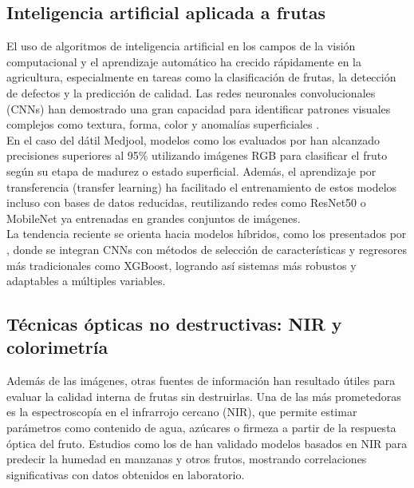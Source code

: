 \subsection{Inteligencia artificial aplicada a frutas}

El uso de algoritmos de inteligencia artificial en los campos de la visión computacional y el aprendizaje automático ha crecido rápidamente en la agricultura, especialmente en tareas como la clasificación de frutas, la detección de defectos y la predicción de calidad. Las redes neuronales convolucionales (CNNs) han demostrado una gran capacidad para identificar patrones visuales complejos como textura, forma, color y anomalías superficiales \parencite{albarrak_deep_2022, alsirhani_novel_2023}.\\

En el caso del dátil Medjool, modelos como los evaluados por \parencite{almomen_date_2023} han alcanzado precisiones superiores al 95\% utilizando imágenes RGB para clasificar el fruto según su etapa de madurez o estado superficial. Además, el aprendizaje por transferencia (transfer learning) ha facilitado el entrenamiento de estos modelos incluso con bases de datos reducidas, reutilizando redes como ResNet50 o MobileNet ya entrenadas en grandes conjuntos de imágenes.\\

La tendencia reciente se orienta hacia modelos híbridos, como los presentados por \parencite{said_smartripen_2025}, donde se integran CNNs con métodos de selección de características y regresores más tradicionales como XGBoost, logrando así sistemas más robustos y adaptables a múltiples variables.\\

\subsection{Técnicas ópticas no destructivas: NIR y colorimetría}

Además de las imágenes, otras fuentes de información han resultado útiles para evaluar la calidad interna de frutas sin destruirlas. Una de las más prometedoras es la espectroscopía en el infrarrojo cercano (NIR), que permite estimar parámetros como contenido de agua, azúcares o firmeza a partir de la respuesta óptica del fruto. Estudios como los de \parencite{chen_prediction_2024, wang_improving_2025} han validado modelos basados en NIR para predecir la humedad en manzanas y otros frutos, mostrando correlaciones significativas con datos obtenidos en laboratorio.\\

